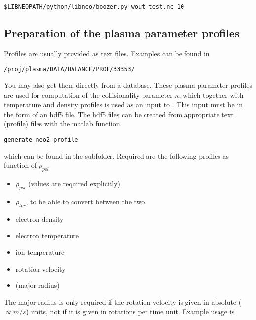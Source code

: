 \documentclass{article}
\newcommand{\vv}[1]{\texttt{\detokenize{#1}}}
\begin{document}
\begin{verbatim}
$LIBNEOPATH/python/libneo/boozer.py wout_test.nc 10
\end{verbatim}

\subsection{Preparation of the plasma parameter profiles\label{running_preparation_profiles}}
Profiles are usually provided as text files. Examples can be found in
\begin{verbatim}
/proj/plasma/DATA/BALANCE/PROF/33353/
\end{verbatim}
You may also get them directly from a database.
These
plasma parameter profiles are used for computation of the collisionality
parameter $\kappa$, which together with temperature and density profiles
is used as an input to \vv{NEO-2-QL}.
This input must be in the form of an hdf5 file.
The hdf5 files can be created from appropriate text (profile) files with the
matlab function
\begin{verbatim}
generate_neo2_profile
\end{verbatim}
which can be found in the \vv{OctaveScripts} subfolder.
Required are the following profiles as function of $\rho_{pol}$
\begin{itemize}
  \item $\rho_{pol}$ (values are required explicitly)
  \item $\rho_{tor}$, to be able to convert between the two.
  \item electron density
  \item electron temperature
  \item ion temperature
  \item rotation velocity
  \item (major radius)
\end{itemize}
The major radius is only required if the rotation velocity is given in
absolute ($\propto m/s$) units, not if it is given in rotations per time
unit.
Example usage is
\end{document}
